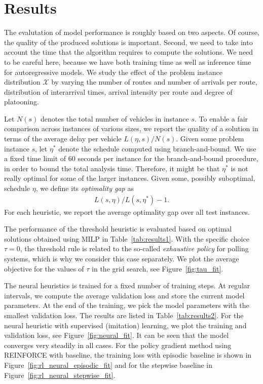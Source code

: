 \documentclass[a4paper]{report}
\theoremstyle{definition}
\theoremstyle{plain}
\begin{document}
\section{Results}

The evalutation of model performance is roughly based on two aspects. Of course,
the quality of the produced solutions is important. Second, we need to take into
account the time that the algorithm requires to compute the solutions. We need
to be careful here, because we have both training time as well as inference
time for autoregressive models.
%
We study the effect of the problem instance distribution $\mathcal{X}$ by
varying the number of routes and number of arrivals per route, distribution of
interarrival times, arrival intensity per route and degree of platooning.

Let $N(s)$ denotes the total number of vehicles in instance $s$. To enable a
fair comparison across instances of various sizes, we report the quality of a
solution in terms of the average delay per vehicle $L(\eta, s) / N(s)$.
%
Given some problem instance $s$, let $\eta^{*}$ denote the schedule computed using
branch-and-bound. We use a fixed time limit of 60 seconds per instance for the
branch-and-bound procedure, in order to bound the total analysis time.
Therefore, it might be that $\eta^{*}$ is not really optimal for some of the larger
instances. Given some, possibly suboptimal, schedule $\eta$, we define its \textit{optimality gap}
as
\begin{align*}
  L(s, \eta) / L(s, \eta^{*}) - 1 .
\end{align*}
For each heuristic, we report the average optimality gap over all test
instances.

The performance of the threshold heuristic is evaluated based on optimal
solutions obtained using MILP in Table~\ref{tab:results1}.
%
With the specific choice $\tau = 0$, the threshold rule is related to the
so-called \textit{exhaustive policy} for polling systems, which is why we
consider this case separately. We plot the average objective for the values of
$\tau$ in the grid search, see Figure~\ref{fig:tau_fit}.

The neural heuristics is trained for a fixed number of training steps. At
regular intervals, we compute the average validation loss and store the current
model parameters. At the end of the training, we pick the model parameters with
the smallest validation loss. The results are listed in Table~\ref{tab:results2}.
%
For the neural heuristic with supervised (imitation) learning, we plot the
training and validation loss, see Figure~\ref{fig:neural_fit}. It can be seen that the model
converges very steadily in all cases.
%
For the policy gradient method using REINFORCE with baseline, the training loss
with episodic baseline is shown in Figure~\ref{fig:rl_neural_episodic_fit} and
for the stepwise baseline in Figure~\ref{fig:rl_neural_stepwise_fit}.
\end{document}
